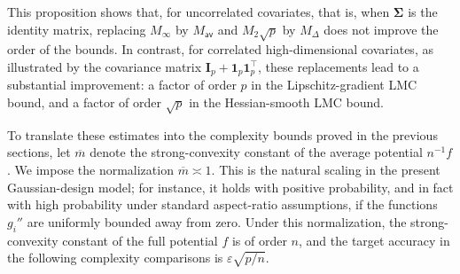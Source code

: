 \documentclass[aos,reqno]{imsart}
\newcommand\bfI{\mathbf I}
\newcommand\bSigma{\boldsymbol\Sigma}
\def\Mav{M_{\textsf{av}}}
\def\Mmax{M_{\infty}}
\def\mbar{\overline m}
\theoremstyle{definition}
\begin{document}
This proposition shows that, for uncorrelated covariates,
that is, when $\bSigma$ is the identity matrix, replacing
$\Mmax$ by $\Mav$ and $M_2\sqrt p$ by $M_\Delta$ does not
improve the order of the bounds. In contrast, for 
correlated high-dimensional covariates, as illustrated 
by the covariance matrix $\bfI_p+\mathbf 1_p\mathbf 
1_p^\top$, these replacements lead to a substantial 
improvement: a factor of order $p$ in the 
Lipschitz-gradient LMC bound, and a factor of order 
$\sqrt p$ in the Hessian-smooth LMC bound.

To translate these estimates into the complexity bounds
proved in the previous sections, let $\mbar$ denote the
strong-convexity constant of the average potential
$n^{-1}f$. We impose the normalization $\mbar\asymp 1$.
This is the natural scaling in the present Gaussian-design
model; for instance, it holds with positive probability,
and in fact with high probability under standard
aspect-ratio assumptions, if the functions $g_i''$ are
uniformly bounded away from zero. Under this normalization,
the strong-convexity constant of the full potential $f$ is
of order $n$, and the target accuracy in the following
complexity comparisons is $\varepsilon\sqrt{p/n}$.
\end{document}

